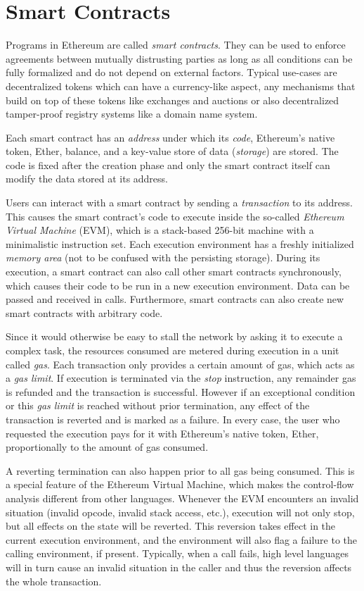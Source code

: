 \section{Smart Contracts}
\label{section:smart_contracts}

Programs in Ethereum are called \emph{smart contracts}.
They can be used to enforce agreements between
mutually distrusting parties as long as all conditions can be fully formalized
and do not depend on external factors. Typical use-cases are decentralized
tokens which can have a currency-like aspect, any mechanisms that build
on top of these tokens like exchanges and auctions or also decentralized
tamper-proof registry systems like a domain name system.

Each smart contract has an \emph{address} under which its \emph{code}, Ethereum's native token, Ether, balance,
and a key-value store of data (\emph{storage}) are stored. The code is fixed after the creation phase
and only the smart contract itself can modify the data stored at its address.

Users can interact with a smart contract by sending a \emph{transaction}
to its address. This causes the smart contract's code to execute inside
the so-called \emph{Ethereum Virtual Machine} (EVM), which is a stack-based
256-bit machine with a minimalistic instruction set. Each execution environment
has a freshly initialized \emph{memory area} (not to be confused with the persisting
storage). During its execution, a smart contract can also call other
smart contracts synchronously, which causes their code to be run in
a new execution environment. Data can be passed and received in calls.
Furthermore, smart contracts can also create new smart contracts with
arbitrary code.

Since it would otherwise be easy to stall the network by asking it to
execute a complex task, the resources consumed are metered during execution
in a unit called \emph{gas}. Each transaction only provides a certain
amount of gas, which acts as a \emph{gas limit}. If execution is terminated via the \emph{stop} instruction,
any remainder gas is refunded and the transaction is successful.
However if an exceptional condition or this \emph{gas limit} is reached without
prior termination, any effect of the transaction is reverted and is marked as a failure.
In every case, the user
who requested the execution pays for it with Ethereum's native token,
Ether, proportionally to the amount of gas consumed.

A reverting termination can also happen prior to all gas being consumed. This is
a special feature of the Ethereum Virtual Machine,
which makes the control-flow analysis different from other languages.
Whenever the EVM encounters an invalid situation (invalid opcode, invalid
stack access, etc.), execution will not only stop, but all effects on the
state will be reverted. This reversion takes effect in the current execution
environment, and the environment will also
flag a failure to the calling environment, if present. Typically,
when a call fails, high level languages will in turn cause an
invalid situation in the caller and thus the reversion
affects the whole transaction.

